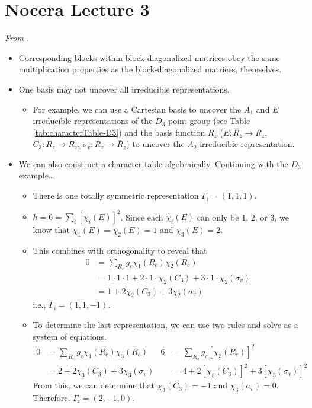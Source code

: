 \documentclass[../notes.tex]{subfiles}
\begin{document}
\section{Nocera Lecture 3}
\emph{From \textcite{bib:NoceraLectures}.}
\begin{itemize}
    \item {}Corresponding blocks within block-diagonalized matrices obey the same multiplication properties as the block-diagonalized matrices, themselves.
    \item One basis may not uncover all irreducible representations.
    \begin{itemize}
        \item For example, we can use a Cartesian basis to uncover the $A_1$ and $E$ irreducible representations of the $D_3$ point group (see Table \ref{tab:characterTable-D3}) and the basis function $R_z$ ($E:R_z\to R_z$, $C_3:R_z\to R_z$, $\sigma_v:R_z\to \bar{R}_z$) to uncover the $A_2$ irreducible representation.
    \end{itemize}
    \item We can also construct a character table algebraically. Continuing with the $D_3$ example\dots
    \begin{itemize}
        \item There is one totally symmetric representation $\Gamma_i=(1,1,1)$.
        \item $h=6=\sum_i[\chi_i(E)]^2$. Since each $\chi_i(E)$ can only be 1, 2, or 3, we know that $\chi_1(E)=\chi_2(E)=1$ and $\chi_3(E)=2$.
        \item This combines with orthogonality to reveal that
        \begin{align*}
            0 &= \sum_{R_c}g_c\chi_1(R_c)\chi_2(R_c)\\
            &= 1\cdot 1\cdot 1+2\cdot 1\cdot\chi_2(C_3)+3\cdot 1\cdot\chi_2(\sigma_v)\\
            &= 1+2\chi_2(C_3)+3\chi_2(\sigma_v)
        \end{align*}
        i.e., $\Gamma_i=(1,1,-1)$.
        \item To determine the last representation, we can use two rules and solve as a system of equations.
        \begin{align*}
            0 &= \sum_{R_c}g_c\chi_1(R_c)\chi_3(R_c)&
                6 &= \sum_{R_c}g_c[\chi_3(R_c)]^2\\
            &= 2+2\chi_3(C_3)+3\chi_3(\sigma_v)&
                &= 4+2[\chi_3(C_3)]^2+3[\chi_3(\sigma_v)]^2
        \end{align*}
        From this, we can determine that $\chi_3(C_3)=-1$ and $\chi_3(\sigma_v)=0$. Therefore, $\Gamma_i=(2,-1,0)$.
    \end{itemize}
\end{itemize}
\end{document}
